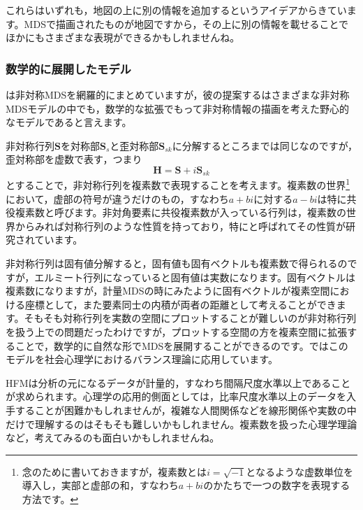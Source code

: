 \documentclass{ltjsbook}
\begin{document}
これらはいずれも，地図の上に別の情報を追加するというアイデアからきています。MDSで描画されたものが地図ですから，その上に別の情報を載せることでほかにもさまざまな表現ができるかもしれませんね。
\subsubsection{数学的に展開したモデル}
\citet{Chino2012}は非対称MDSを網羅的にまとめていますが，彼の提案するはさまざまな非対称MDSモデルの中でも，数学的な拡張でもって非対称情報の描画を考えた野心的なモデルであると言えます。

非対称行列$\bm{S}$を対称部$\bm{S}_s$と歪対称部$\bm{S}_{sk}$に分解するところまでは同じなのですが，歪対称部を虚数で表す，つまり
\[ \bm{H} = \bm{S} + i\bm{S}_{sk} \]
とすることで，非対称行列を複素数で表現することを考えます。複素数の世界\footnote{念のために書いておきますが，複素数とは$i=\sqrt{-1}$となるような虚数単位を導入し，実部と虚部の和，すなわち$a+bi$のかたちで一つの数字を表現する方法です。}において，虚部の符号が違うだけのもの，すなわち$a + bi$に対する$a - bi$は特に共役複素数と呼びます。非対角要素に共役複素数が入っている行列は，複素数の世界からみれば対称行列のような性質を持っており，特にと呼ばれてその性質が研究されています。

非対称行列は固有値分解すると，固有値も固有ベクトルも複素数で得られるのですが，エルミート行列になっていると固有値は実数になります。固有ベクトルは複素数になりますが，計量MDSの時にみたように固有ベクトルが複素空間における座標として，また要素同士の内積が両者の距離として考えることができます。そもそも対称行列を実数の空間にプロットすることが難しいのが非対称行列を扱う上での問題だったわけですが，プロットする空間の方を複素空間に拡張することで，数学的に自然な形でMDSを展開することができるのです。\citet{kosugi2004}ではこのモデルを社会心理学におけるバランス理論に応用しています。

HFMは分析の元になるデータが計量的，すなわち間隔尺度水準以上であることが求められます。心理学の応用的側面としては，比率尺度水準以上のデータを入手することが困難かもしれませんが，複雑な人間関係などを線形関係や実数の中だけで理解するのはそもそも難しいかもしれません。複素数を扱った心理学理論など，考えてみるのも面白いかもしれませんね。
\end{document}
